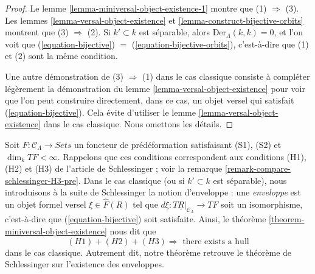 \begin{proof}
Le lemme \ref{lemma-miniversal-object-existence-1} montre que
(1) $\Rightarrow$ (3). Les lemmes \ref{lemma-versal-object-existence} et
\ref{lemma-construct-bijective-orbits} montrent que
(3) $\Rightarrow$ (2). Si $k' \subset k$ est séparable, alors
$\text{Der}_\Lambda(k, k) = 0$, et l'on voit que
(\ref{equation-bijective}) $=$ (\ref{equation-bijective-orbits}),
c'est-à-dire que (1) et (2) sont la même condition.

\medskip\noindent
Une autre démonstration de (3) $\Rightarrow$ (1) dans le cas classique
consiste à compléter légèrement la démonstration du lemme
\ref{lemma-versal-object-existence} pour voir que l'on peut construire
directement, dans ce cas, un objet versel qui satisfait
(\ref{equation-bijective}). Cela évite d'utiliser le lemme
\ref{lemma-versal-object-existence} dans le cas classique. Nous omettons les
détails.
\end{proof}

\begin{remark}
\label{remark-compare-schlessinger-H3}
Soit $F : \mathcal{C}_\Lambda \to \textit{Sets}$ un foncteur de
prédéformation satisfaisant (S1), (S2) et $\dim_k TF < \infty$. Rappelons que
ces conditions correspondent aux conditions (H1), (H2) et (H3) de l'article
de Schlessinger ; voir la remarque
\ref{remark-compare-schlessinger-H3-pre}. Dans le cas classique (ou si
$k' \subset k$ est séparable), nous introduisons à la suite de Schlessinger
la notion d'enveloppe : une {\it enveloppe} est un objet formel versel
$\xi \in \widehat{F}(R)$ tel que
$d\underline{\xi} : T\underline{R}|_{\mathcal{C}_\Lambda} \to TF$
soit un isomorphisme, c'est-à-dire que (\ref{equation-bijective}) soit
satisfaite. Ainsi, le théorème \ref{theorem-miniversal-object-existence} nous
dit que
$$
(H1) + (H2) + (H3)
\Rightarrow
\text{ there exists a hull}
$$
dans le cas classique. Autrement dit, notre théorème retrouve le théorème de
Schlessinger sur l'existence des enveloppes.
\end{remark}

